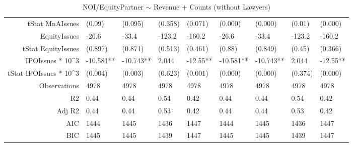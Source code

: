 \begin{table}[ht]
\begin{tabular}{rllllllll}
  tStat MnAIssues & (0.09) & (0.095) & (0.358) & (0.071) & (0.000) & (0.000) & (0.01) & (0.000) \\ 
  EquityIssues & -26.6 & -33.4 & -123.2 & -160.2 & -26.6 & -33.4 & -123.2 & -160.2 \\ 
  tStat EquityIssues & (0.897) & (0.871) & (0.513) & (0.461) & (0.88) & (0.849) & (0.45) & (0.366) \\ 
  IPOIssues * 10^3 & -10.581** & -10.743** & 2.044 & -12.55** & -10.581** & -10.743** & 2.044 & -12.55** \\ 
  tStat IPOIssues * 10^3 & (0.004) & (0.003) & (0.623) & (0.001) & (0.000) & (0.000) & (0.374) & (0.000) \\ 
  Observations & 4978 & 4978 & 4978 & 4978 & 4978 & 4978 & 4978 & 4978 \\ 
  R2 & 0.44 & 0.44 & 0.54 & 0.42 & 0.44 & 0.44 & 0.54 & 0.42 \\ 
  Adj R2 & 0.44 & 0.44 & 0.53 & 0.42 & 0.44 & 0.44 & 0.53 & 0.42 \\ 
  AIC & 1444 & 1445 & 1436 & 1447 & 1444 & 1445 & 1436 & 1447 \\ 
  BIC & 1445 & 1445 & 1439 & 1447 & 1445 & 1445 & 1439 & 1447 \\ 
   \hline
\end{tabular}
\caption{NOI/EquityPartner $\sim$ Revenue + Counts (without Lawyers)} 
\end{table}
